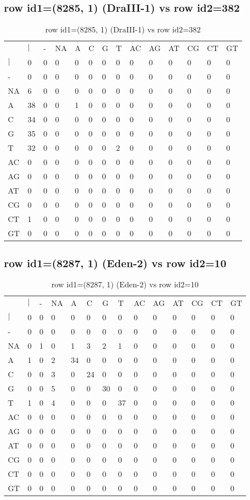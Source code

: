 \subsection{row id1=(8285, 1) (DraIII-1) vs row id2=382}
\begin{center}
\begin{longtable}{|l|l|l|l|l|l|l|l|l|l|l|l|l|l|}
\caption{row id1=(8285, 1) (DraIII-1) vs row id2=382} \label{table_dm446}\\
\hline
\\
\hline
&$|$&-&NA&A&C&G&T&AC&AG&AT&CG&CT&GT\\
$|$&0&0&0&0&0&0&0&0&0&0&0&0&0\\
-&0&0&0&0&0&0&0&0&0&0&0&0&0\\
NA&6&0&0&0&0&0&0&0&0&0&0&0&0\\
A&38&0&0&1&0&0&0&0&0&0&0&0&0\\
C&34&0&0&0&0&0&0&0&0&0&0&0&0\\
G&35&0&0&0&0&0&0&0&0&0&0&0&0\\
T&32&0&0&0&0&0&2&0&0&0&0&0&0\\
AC&0&0&0&0&0&0&0&0&0&0&0&0&0\\
AG&0&0&0&0&0&0&0&0&0&0&0&0&0\\
AT&0&0&0&0&0&0&0&0&0&0&0&0&0\\
CG&0&0&0&0&0&0&0&0&0&0&0&0&0\\
CT&1&0&0&0&0&0&0&0&0&0&0&0&0\\
GT&0&0&0&0&0&0&0&0&0&0&0&0&0\\
\hline
\end{longtable}
\end{center}

\subsection{row id1=(8287, 1) (Eden-2) vs row id2=10}
\begin{center}
\begin{longtable}{|l|l|l|l|l|l|l|l|l|l|l|l|l|l|}
\caption{row id1=(8287, 1) (Eden-2) vs row id2=10} \label{table_dm448}\\
\hline
\\
\hline
&$|$&-&NA&A&C&G&T&AC&AG&AT&CG&CT&GT\\
$|$&0&0&0&0&0&0&0&0&0&0&0&0&0\\
-&0&0&0&0&0&0&0&0&0&0&0&0&0\\
NA&0&1&0&1&3&2&1&0&0&0&0&0&0\\
A&1&0&2&34&0&0&0&0&0&0&0&0&0\\
C&0&0&3&0&24&0&0&0&0&0&0&0&0\\
G&0&0&5&0&0&30&0&0&0&0&0&0&0\\
T&1&0&4&0&0&0&37&0&0&0&0&0&0\\
AC&0&0&0&0&0&0&0&0&0&0&0&0&0\\
AG&0&0&0&0&0&0&0&0&0&0&0&0&0\\
AT&0&0&0&0&0&0&0&0&0&0&0&0&0\\
CG&0&0&0&0&0&0&0&0&0&0&0&0&0\\
CT&0&0&0&0&0&0&0&0&0&0&0&0&0\\
GT&0&0&0&0&0&0&0&0&0&0&0&0&0\\
\hline
\end{longtable}
\end{center}

